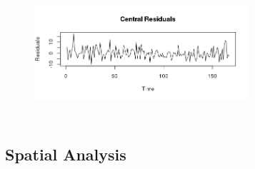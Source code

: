 \documentclass{article} %
\begin{document}
\begin{center}
\begin{figure}[H]
\includegraphics[height=50mm, width=80mm]{Plots/Central_residuals.png}
\end{figure}
\end{center}

\subsection{Spatial Analysis}
\label{appendix_spatial}
\end{document}
